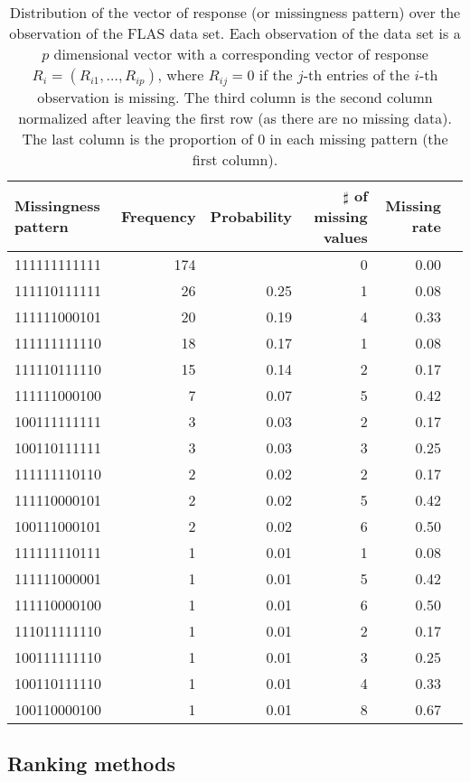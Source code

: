 \begin{table}[ht]
\centering
\begin{tabular}{lrrrrr}
  \hline
  Missingness pattern & Frequency & Probability & $\sharp$ of missing values & Missing rate \\
  \hline
  111111111111 & 174 &      &   0 & 0.00 \\
  111110111111 &  26 & 0.25 &   1 & 0.08 \\
  111111000101 &  20 & 0.19 &   4 & 0.33 \\
  111111111110 &  18 & 0.17 &   1 & 0.08 \\
  111110111110 &  15 & 0.14 &   2 & 0.17 \\
  111111000100 &   7 & 0.07 &   5 & 0.42 \\
  100111111111 &   3 & 0.03 &   2 & 0.17 \\
  100110111111 &   3 & 0.03 &   3 & 0.25 \\
  111111110110 &   2 & 0.02 &   2 & 0.17 \\
  111110000101 &   2 & 0.02 &   5 & 0.42 \\
  100111000101 &   2 & 0.02 &   6 & 0.50 \\
  111111110111 &   1 & 0.01 &   1 & 0.08 \\
  111111000001 &   1 & 0.01 &   5 & 0.42 \\
  111110000100 &   1 & 0.01 &   6 & 0.50 \\
  111011111110 &   1 & 0.01 &   2 & 0.17 \\
  100111111110 &   1 & 0.01 &   3 & 0.25 \\
  100110111110 &   1 & 0.01 &   4 & 0.33 \\
  100110000100 &   1 & 0.01 &   8 & 0.67 \\
  \hline
\end{tabular}
\caption{
  Distribution of the vector of response (or missingness pattern) over the
  observation of the FLAS data set.  Each observation of the data set is a $p$
  dimensional vector with a corresponding vector of response $R_i = (R_{i1},
  \dots, R_{ip})$, where $R_{ij} = 0$ if the $j$-th entries of the $i$-th observation is
  missing. The third column is the second column normalized after leaving the
  first row (as there are no missing data). The last column is the proportion
  of $0$ in each missing pattern (the first column).}
\label{tbl:flas:missingness:pattern}
\end{table}

\subsection{Ranking methods}

